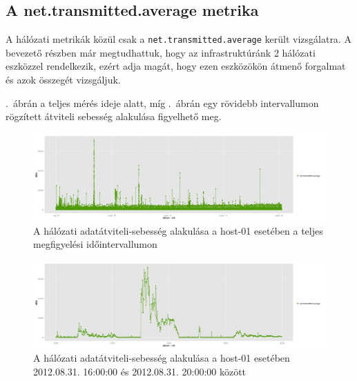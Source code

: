 \documentclass[a4paper,10pt,titlepage]{article}
\begin{document}
\subsection{A net.transmitted.average metrika}

A hálózati metrikák közül csak a \texttt{net.transmitted.average} került vizsgálatra. A bevezető részben már megtudhattuk, hogy az infrastruktúránk 2 hálózati eszközzel rendelkezik, ezért adja magát, hogy ezen eszközökön átmenő forgalmat és azok összegét vizsgáljuk.

.~ábrán a teljes mérés ideje alatt, míg .~ábrán egy rövidebb intervallumon rögzített átviteli sebesség alakulása figyelhető meg.

\begin{figure}[h!]
\centering
\includegraphics[width=1.00\textwidth]{figures/net_transmitted_average-20120826230140-20120924083120.png}
\caption{ A hálózati adatátviteli-sebesség alakulása a host-01 esetében a teljes megfigyelési időintervallumon \label{fig:net_transmitted_average-01}}
\end{figure}

\begin{figure}[h!]
\centering
\includegraphics[width=1.00\textwidth]{figures/net_transmitted_average-20120831160000-20120831200000.png}
\caption{ A hálózati adatátviteli-sebesség alakulása a host-01 esetében 2012.08.31. 16:00:00 és 2012.08.31. 20:00:00 között \label{fig:net_transmitted_average-02}}
\end{figure}
\end{document}
